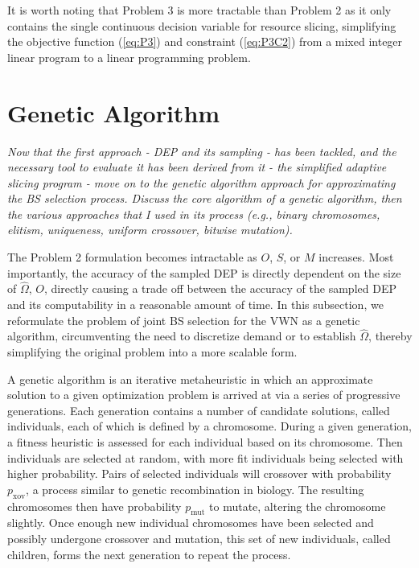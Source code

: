 \documentclass[12pt,dvipsnames]{report}
\begin{document}
It is worth noting that Problem 3 is more tractable than Problem 2 as it only contains the single continuous decision variable for resource slicing, simplifying the objective function (\ref{eq:P3}) and constraint (\ref{eq:P3C2}) from a mixed integer linear program to a linear programming problem.

\section{Genetic Algorithm} \label{sec:ga}

\textit{Now that the first approach - DEP and its sampling - has been tackled, and the necessary tool to evaluate it has been derived from it - the simplified adaptive slicing program - move on to the genetic algorithm approach for approximating the BS selection process.  Discuss the core algorithm of a genetic algorithm, then the various approaches that I used in its process (e.g., binary chromosomes, elitism, uniqueness, uniform crossover, bitwise mutation).}

The Problem 2 formulation becomes intractable as $O$, $S$, or $M$ increases.  Most importantly, the accuracy of the sampled DEP is directly dependent on the size of $\hat{\Omega}$, $O$, directly causing a trade off between the accuracy of the sampled DEP and its computability in a reasonable amount of time.  In this subsection, we reformulate the problem of joint BS selection for the VWN as a genetic algorithm, circumventing the need to discretize demand or to establish $\hat{\Omega}$, thereby simplifying the original problem into a more scalable form.

A genetic algorithm is an iterative metaheuristic in which an approximate solution to a given optimization problem is arrived at via a series of progressive generations.  Each generation contains a number of candidate solutions, called individuals, each of which is defined by a chromosome.  During a given generation, a fitness heuristic is assessed for each individual based on its chromosome.  Then individuals are selected at random, with more fit individuals being selected with higher probability.  Pairs of selected individuals will crossover with probability $p_\text{xov}$, a process similar to genetic recombination in biology.  The resulting chromosomes then have probability $p_\text{mut}$ to mutate, altering the chromosome slightly.  Once enough new individual chromosomes have been selected and possibly undergone crossover and mutation, this set of new individuals, called children, forms the next generation to repeat the process.  %
\end{document}
